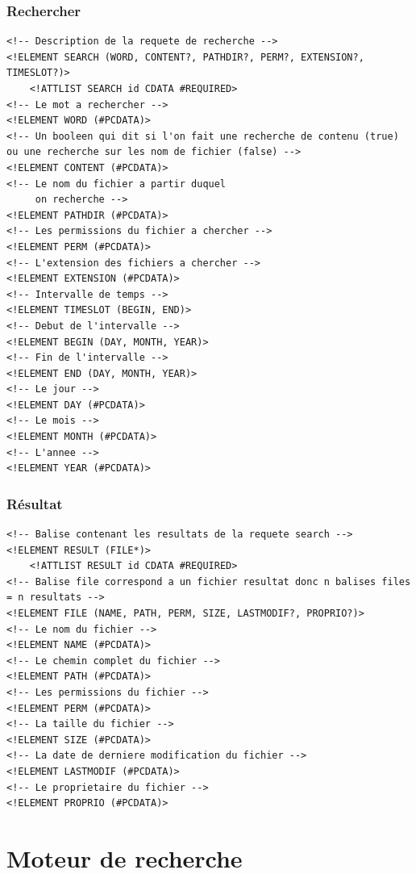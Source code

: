 \documentclass[a4paper,12pt]{report}
\begin{document}
\subsubsection{Rechercher}\label{dtd_bi_mr_search}
\begin{lstlisting}[frame=single]
<!-- Description de la requete de recherche -->
<!ELEMENT SEARCH (WORD, CONTENT?, PATHDIR?, PERM?, EXTENSION?, TIMESLOT?)>
	<!ATTLIST SEARCH id CDATA #REQUIRED>
<!-- Le mot a rechercher -->
<!ELEMENT WORD (#PCDATA)>
<!-- Un booleen qui dit si l'on fait une recherche de contenu (true) ou une recherche sur les nom de fichier (false) -->
<!ELEMENT CONTENT (#PCDATA)>
<!-- Le nom du fichier a partir duquel
     on recherche -->
<!ELEMENT PATHDIR (#PCDATA)>
<!-- Les permissions du fichier a chercher -->
<!ELEMENT PERM (#PCDATA)>
<!-- L'extension des fichiers a chercher -->
<!ELEMENT EXTENSION (#PCDATA)>
<!-- Intervalle de temps -->
<!ELEMENT TIMESLOT (BEGIN, END)>
<!-- Debut de l'intervalle -->
<!ELEMENT BEGIN (DAY, MONTH, YEAR)>
<!-- Fin de l'intervalle -->
<!ELEMENT END (DAY, MONTH, YEAR)>
<!-- Le jour -->
<!ELEMENT DAY (#PCDATA)>
<!-- Le mois -->
<!ELEMENT MONTH (#PCDATA)>
<!-- L'annee -->
<!ELEMENT YEAR (#PCDATA)>
\end{lstlisting}

\subsubsection{Résultat}\label{dtd_bi_mr_result}
\begin{lstlisting}[frame=single]
<!-- Balise contenant les resultats de la requete search -->
<!ELEMENT RESULT (FILE*)>
	<!ATTLIST RESULT id CDATA #REQUIRED>
<!-- Balise file correspond a un fichier resultat donc n balises files = n resultats -->
<!ELEMENT FILE (NAME, PATH, PERM, SIZE, LASTMODIF?, PROPRIO?)>
<!-- Le nom du fichier -->
<!ELEMENT NAME (#PCDATA)>
<!-- Le chemin complet du fichier -->
<!ELEMENT PATH (#PCDATA)>
<!-- Les permissions du fichier -->
<!ELEMENT PERM (#PCDATA)>
<!-- La taille du fichier -->
<!ELEMENT SIZE (#PCDATA)>
<!-- La date de derniere modification du fichier -->
<!ELEMENT LASTMODIF (#PCDATA)>
<!-- Le proprietaire du fichier -->
<!ELEMENT PROPRIO (#PCDATA)>
\end{lstlisting}

\section{Moteur de recherche}
\end{document}
